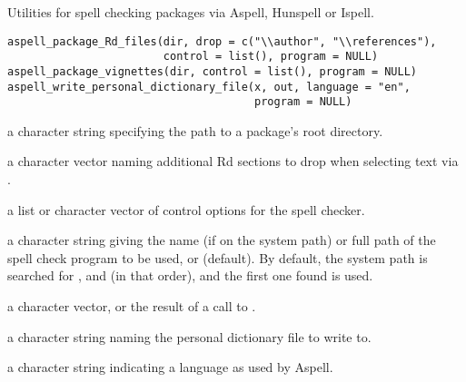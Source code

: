 %
\begin{Description}\relax
Utilities for spell checking packages via Aspell, Hunspell or Ispell.
\end{Description}
%
\begin{Usage}
\begin{verbatim}
aspell_package_Rd_files(dir, drop = c("\\author", "\\references"),
                        control = list(), program = NULL)
aspell_package_vignettes(dir, control = list(), program = NULL)
aspell_write_personal_dictionary_file(x, out, language = "en",
                                      program = NULL)
\end{verbatim}
\end{Usage}
%
\begin{Arguments}
\begin{ldescription}
\item[\code{dir}] a character string specifying the path to a package's root
directory.
\item[\code{drop}] a character vector naming additional Rd sections to drop
when selecting text via .
\item[\code{control}] a list or character vector of control options for
the spell checker.
\item[\code{program}] a character string giving the name (if on the system
path) or full path of the spell check program to be used, or
 (default).  By default, the system path is searched for
,  and  (in that
order), and the first one found is used.
\item[\code{x}] a character vector, or the result of a call to
.
\item[\code{out}] a character string naming the personal dictionary file to
write to.
\item[\code{language}] a character string indicating a language as used by
Aspell.
\end{ldescription}
\end{Arguments}

